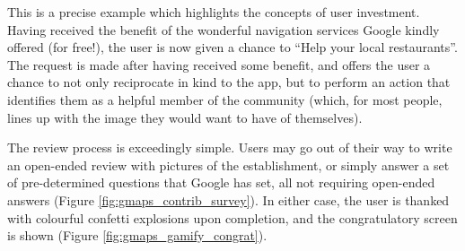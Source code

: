 This is a precise example which highlights the concepts of user investment. Having received the benefit of the wonderful navigation services Google kindly offered (for free!), the user is now given a chance to ``Help your local restaurants''. The request is made after having received some benefit, and offers the user a chance to not only reciprocate in kind to the app, but to perform an action that identifies them as a helpful member of the community (which, for most people, lines up with the image they would want to have of themselves).

The review process is exceedingly simple. Users may go out of their way to write an open-ended review with pictures of the establishment, or simply answer a set of pre-determined questions that Google has set, all not requiring open-ended answers (Figure \ref{fig:gmaps_contrib_survey}). In either case, the user is thanked with colourful confetti explosions upon completion, and the congratulatory screen is shown (Figure \ref{fig:gmaps_gamify_congrat}).

